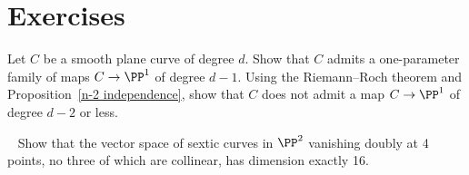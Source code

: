 \section{Exercises}

\begin{exercise}\label{gonality of smooth plane curve}
Let $C$ be a smooth plane curve of degree $d$. Show that $C$ admits a
one-parameter family of maps $C \to \PP^1$ of degree $d-1$. Using the
Riemann--Roch theorem
%
and Proposition~\ref{n-2 independence}, show
that $C$ does not admit a map $C \to \PP^1$ of degree $d-2$ or less.
\end{exercise}

\begin{exercise}~\label{double vanishing at 4 points}
Show that the vector space of
sextic curves
%
in $\PP^2$ vanishing doubly at 4 points, no three of which are
collinear,  has dimension
exactly 16.
\end{exercise}

